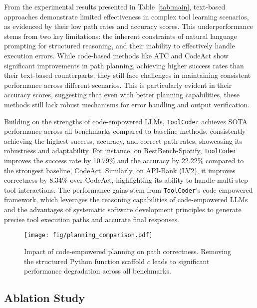 From the experimental results presented in Table~\ref{tab:main}, text-based approaches demonstrate limited effectiveness in complex tool learning scenarios, as evidenced by their low path rates and accuracy scores. This underperformance stems from two key limitations: the inherent constraints of natural language prompting for structured reasoning, and their inability to effectively handle execution errors. While code-based methods like ATC and CodeAct show significant improvements in path planning, achieving higher success rates than their text-based counterparts, they still face challenges in maintaining consistent performance across different scenarios. This is particularly evident in their accuracy scores, suggesting that even with better planning capabilities, these methods still lack robust mechanisms for error handling and output verification. 

Building on the strengths of code-empowered LLMs, \texttt{ToolCoder} achieves SOTA performance across all benchmarks compared to baseline methods, consistently achieving the highest success, accuracy, and correct path rates, showcasing its robustness and adaptability. For instance, on RestBench-Spotify, \texttt{ToolCoder} improves the success rate by 10.79\% and the accuracy by 22.22\% compared to the strongest baseline, CodeAct. Similarly, on API-Bank (LV2), it improves correctness by 8.34\% over CodeAct, highlighting its ability to handle multi-step tool interactions. The performance gains stem from \texttt{ToolCoder}'s code-empowered framework, which leverages the reasoning capabilities of code-empowered LLMs and the advantages of systematic software development principles to generate precise tool execution paths and accurate final responses.

\begin{figure}[t]
    \centering
    \texttt{[image: fig/planning\_comparison.pdf]}
    \caption{Impact of code-empowered planning on path correctness. Removing the structured Python function scaffold $c$ leads to significant performance degradation across all benchmarks.}
    \label{fig:planning_comparison}
    \vspace{-0.65cm}
\end{figure}

\subsection{Ablation Study}
